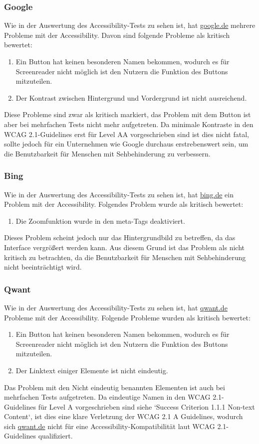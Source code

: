\subsubsection{Google}\label{subsubsec:google}
Wie in der Auswertung des Accessibility-Tests zu sehen ist, hat \url{google.de} mehrere Probleme mit der Accessibility.
Davon sind folgende Probleme als kritisch bewertet:
\begin{enumerate}
    \item Ein Button hat keinen besonderen Namen bekommen, wodurch es für Screenreader nicht möglich ist den Nutzern die Funktion des Buttons mitzuteilen.
    \item Der Kontrast zwischen Hintergrund und Vordergrund ist nicht ausreichend.
\end{enumerate}
Diese Probleme sind zwar als kritisch markiert, das Problem mit dem Button ist aber bei mehrfachen Tests nicht mehr aufgetreten.
Da minimale Kontraste in den WCAG 2.1-Guidelines erst für Level AA vorgeschrieben sind ist dies nicht fatal, sollte jedoch für ein Unternehmen wie Google durchaus erstrebenswert sein,
um die Benutzbarkeit für Menschen mit Sehbehinderung zu verbessern.

\subsubsection{Bing}\label{subsubsec:bing}
Wie in der Auswertung des Accessibility-Tests zu sehen ist, hat \url{bing.de} ein Problem mit der Accessibility.
Folgendes Problem wurde als kritisch bewertet:
\begin{enumerate}
    \item Die Zoomfunktion wurde in den meta-Tags deaktiviert.
\end{enumerate}
Dieses Problem scheint jedoch nur das Hintergrundbild zu betreffen, da das Interface vergrößert werden kann.
Aus diesem Grund ist das Problem als nicht kritisch zu betrachten, da die Benutzbarkeit für Menschen mit Sehbehinderung nicht beeinträchtigt wird.

\subsubsection{Qwant}\label{subsubsec:qwant}
Wie in der Auswertung des Accessibility-Tests zu sehen ist, hat \url{qwant.de} Probleme mit der Accessibility.
Folgende Probleme wurden als kritisch bewertet:
\begin{enumerate}
    \item Ein Button hat keinen besonderen Namen bekommen, wodurch es für Screenreader nicht möglich ist den Nutzern die Funktion des Buttons mitzuteilen.
    \item Der Linktext einiger Elemente ist nicht eindeutig.
\end{enumerate}
Das Problem mit den Nicht eindeutig benannten Elementen ist auch bei mehrfachen Tests aufgetreten.
Da eindeutige Namen in den WCAG 2.1-Guidelines für Level A vorgeschrieben sind siehe `Success Criterion 1.1.1 Non-text Content`\cite{WCAG21},
ist dies eine klare Verletzung der WCAG 2.1 A Guidelines, wodurch sich \url{qwant.de} nicht für eine Accessibility-Kompatibilität laut WCAG 2.1-Guidelines qualifiziert.